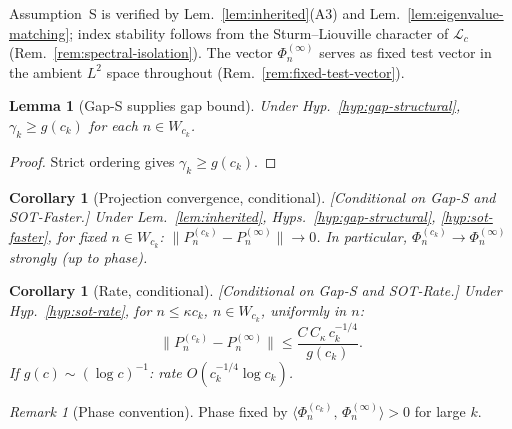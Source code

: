 \documentclass[12pt,a4paper]{amsart}
\newtheorem{lemma}[theorem]{Lemma}
\newtheorem{corollary}[theorem]{Corollary}
\theoremstyle{definition}
\theoremstyle{remark}
\newtheorem{remark}[theorem]{Remark}
\newcommand{\ip}[2]{\langle #1,\, #2\rangle}
\begin{document}
\begin{center}
\end{center}

\medskip
Assumption~S is verified by
Lem.~\ref{lem:inherited}(A3)
and Lem.~\ref{lem:eigenvalue-matching};
index stability follows from the
Sturm--Liouville character of
$\mathcal{L}_c$
(Rem.~\ref{rem:spectral-isolation}).
The vector $\Phi_n^{(\infty)}$ serves
as fixed test vector in the ambient
$L^2$ space throughout
(Rem.~\ref{rem:fixed-test-vector}).

\begin{lemma}[Gap-S supplies gap bound]
\label{lem:gap-bridge}
Under Hyp.~\ref{hyp:gap-structural},
$\gamma_k\ge g(c_k)$
for each $n\in W_{c_k}$.
\end{lemma}
\begin{proof}
Strict ordering gives
$\gamma_k\ge g(c_k)$.
\end{proof}

\begin{corollary}[Projection convergence,
  conditional]
\label{cor:convergence}
\textup{[Conditional on Gap-S and
SOT-Faster.]}
Under Lem.~\ref{lem:inherited},
Hyps.~\ref{hyp:gap-structural},
\ref{hyp:sot-faster},
for fixed $n\in W_{c_k}$:
$\|P_n^{(c_k)}-P_n^{(\infty)}\|\to 0$.
In particular,
$\Phi_n^{(c_k)}\to\Phi_n^{(\infty)}$
strongly (up to phase).
\end{corollary}

\begin{corollary}[Rate, conditional]
\label{cor:rate}
\textup{[Conditional on Gap-S and
SOT-Rate.]}
Under Hyp.~\ref{hyp:sot-rate},
for $n\le\kappa c_k$, $n\in W_{c_k}$,
uniformly in $n$:
\[
  \|P_n^{(c_k)}-P_n^{(\infty)}\|
  \le
  \frac{C\,C_\kappa\,c_k^{-1/4}}
  {g(c_k)}.
\]
If $g(c)\sim(\log c)^{-1}$:
rate $O(c_k^{-1/4}\log c_k)$.
\end{corollary}

\begin{remark}[Phase convention]
Phase fixed by
$\ip{\Phi_n^{(c_k)}}{\Phi_n^{(\infty)}}>0$
for large $k$.
\end{remark}
\end{document}

